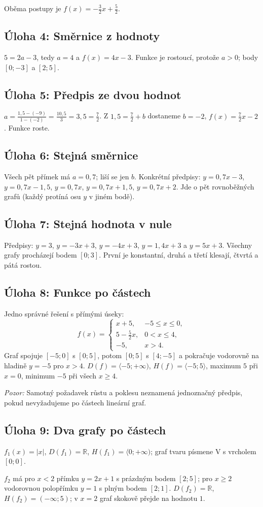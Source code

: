 \documentclass[10pt,a4paper]{article}
\newcommand{\key}[1]{\subsection*{Úloha #1}}
\begin{document}
Oběma postupy je $\displaystyle f(x)=-\frac32x+\frac52$.
\key{4: Směrnice z hodnoty}
$5=2a-3$, tedy $a=4$ a $f(x)=4x-3$. Funkce je rostoucí, protože $a>0$; body $[0;-3]$ a $[2;5]$.
\key{5: Předpis ze dvou hodnot}
$\displaystyle a=\frac{1{,}5-(-9)}{1-(-2)}=\frac{10{,}5}{3}=3{,}5=\frac72$.
Z $1{,}5=\frac72+b$ dostaneme $b=-2$,
$\displaystyle f(x)=\frac72x-2$. Funkce roste.
\key{6: Stejná směrnice}
Všech pět přímek má $a=0{,}7$; liší se jen $b$. Konkrétní předpisy:
$y=0{,}7x-3$, $y=0{,}7x-1{,}5$, $y=0{,}7x$,
$y=0{,}7x+1{,}5$, $y=0{,}7x+2$.
Jde o pět rovnoběžných grafů (každý protíná osu $y$ v jiném bodě).
\key{7: Stejná hodnota v nule}
Předpisy: $y=3$, $y=-3x+3$, $y=-4x+3$, $y=1{,}4x+3$ a $y=5x+3$.
Všechny grafy procházejí bodem $[0;3]$. První je konstantní,
druhá a třetí klesají, čtvrtá a pátá rostou.
\key{8: Funkce po částech}
Jedno správné řešení s přímými úseky:
\[
f(x)=\begin{cases}
x+5,&-5\le x\le 0,\\
5-\frac52x,&0<x\le4,\\
-5,&x>4.
\end{cases}
\]
Graf spojuje $[-5;0]$ s $[0;5]$, potom $[0;5]$ s $[4;-5]$ a pokračuje vodorovně na hladině $y=-5$ pro $x>4$.
$D(f)=\langle-5;+\infty)$, $H(f)=\langle-5;5\rangle$,
maximum $5$ při $x=0$, minimum $-5$ při všech $x\ge4$.\par
\textit{Pozor:} Samotný požadavek růstu a poklesu neznamená jednoznačný předpis, pokud nevyžadujeme po částech lineární graf.
\key{9: Dva grafy po částech}
$f_1(x)=|x|$, $D(f_1)=\mathbb R$, $H(f_1)=\langle0;+\infty)$; graf tvaru písmene V s vrcholem $[0;0]$.\par
$f_2$ má pro $x<2$ přímku $y=2x+1$ s prázdným bodem $[2;5]$; pro $x\ge2$ vodorovnou polopřímku $y=1$ s plným bodem $[2;1]$.
$D(f_2)=\mathbb R$, $H(f_2)=(-\infty;5)$; v $x=2$ graf skokově přejde na hodnotu $1$.
\newpage
\end{document}
